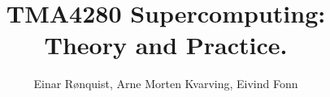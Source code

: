 \documentclass[a4paper]{tmanotes}
\begin{document}
\title{TMA4280 Supercomputing: Theory and Practice.}
\author{Einar R{\o}nquist, Arne Morten Kvarving, Eivind Fonn}

\date{}

\maketitle

\newpage

\tableofcontents

\newpage



\newpage


\newpage


\newpage


\newpage


\newpage


\newpage


\newpage


\newpage


\newpage


\newpage


\newpage


\newpage

\end{document}
